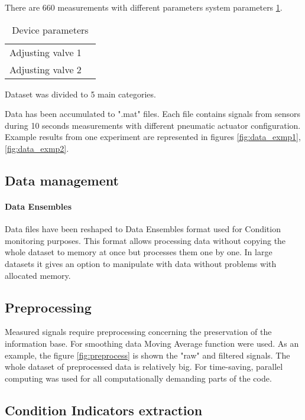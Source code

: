 \documentclass[class=article, crop=false]{standalone}
\begin{document}
There are 660 measurements with different parameters system parameters
\ref{tab:params}.
\begin{table}[h]
    \centering
    \begin{tabular}{|c|c|}
        \hline
        Adjusting valve 1 &  \\
        Adjusting valve 2 &  \\
        \hline
    \end{tabular}
    \caption{Device parameters}
    \label{tab:params}
\end{table}

Dataset was divided to 5 main categories.


\begin{itemize}
\end{itemize}

Data has been accumulated to ".mat" files.
Each file contains signals from sensors during 10 seconds measurements with
different pneumatic actuator configuration. Example results from one
experiment are represented in figures \ref{fig:data_exmp1},
\ref{fig:data_exmp2}. 


\subsection{Data management}
\paragraph{Data Ensembles}
Data files have been reshaped to Data Ensembles format used for Condition
monitoring purposes. This format allows processing data without copying the
whole dataset to memory at once but processes them one by one. In large datasets
it gives an option to manipulate with data without problems with allocated memory.

\subsection{Preprocessing}
Measured signals require preprocessing concerning the preservation of the information
base. For smoothing data Moving Average function were used.
As an example, the figure \ref{fig:preprocess} is shown the "raw" and filtered signals.
The whole dataset of preprocessed data is relatively big. For
time-saving, parallel computing was used for all computationally
demanding parts of the code.


\subsection{Condition Indicators extraction}
\end{document}
